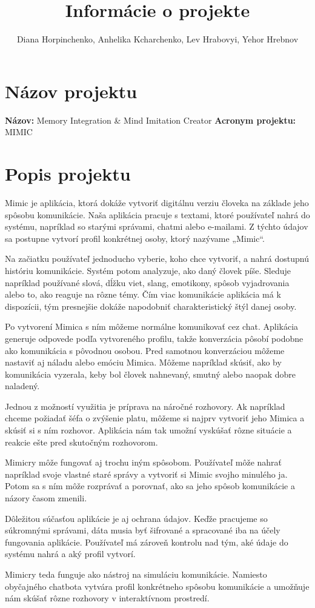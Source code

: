 \documentclass[12pt,a4paper]{article}
\title{Informácie o projekte}
\author{Diana Horpinchenko, Anhelika Kcharchenko, Lev Hrabovyi, Yehor Hrebnov}
\begin{document}
 
\maketitle \section*{Názov projektu} 
\textbf{Názov:} Memory Integration \& Mind Imitation Creator
 \vspace{0.5cm}
 \textbf{Acronym projektu:} MIMIC 
\vspace{0.5cm} 
\section*{Popis projektu} 
Mimic je aplikácia, ktorá dokáže vytvoriť digitálnu verziu človeka na základe jeho spôsobu komunikácie. Naša aplikácia pracuje s textami, ktoré používateľ nahrá do systému, napríklad so starými správami, chatmi alebo e-mailami. Z týchto údajov sa postupne vytvorí profil konkrétnej osoby, ktorý nazývame „Mimic“.

Na začiatku používateľ jednoducho vyberie, koho chce vytvoriť, a nahrá dostupnú históriu komunikácie. Systém potom analyzuje, ako daný človek píše. Sleduje napríklad používané slová, dĺžku viet, slang, emotikony, spôsob vyjadrovania alebo to, ako reaguje na rôzne témy. Čím viac komunikácie aplikácia má k dispozícii, tým presnejšie dokáže napodobniť charakteristický štýl danej osoby.

Po vytvorení Mimica s ním môžeme normálne komunikovať cez chat. Aplikácia generuje odpovede podľa vytvoreného profilu, takže konverzácia pôsobí podobne ako komunikácia s pôvodnou osobou. Pred samotnou konverzáciou môžeme nastaviť aj náladu alebo emóciu Mimica. Môžeme napríklad skúsiť, ako by komunikácia vyzerala, keby bol človek nahnevaný, smutný alebo naopak dobre naladený.

Jednou z možností využitia je príprava na náročné rozhovory. Ak napríklad chceme požiadať šéfa o zvýšenie platu, môžeme si najprv vytvoriť jeho Mimica a skúsiť si s ním rozhovor. Aplikácia nám tak umožní vyskúšať rôzne situácie a reakcie ešte pred skutočným rozhovorom.

Mimicry môže fungovať aj trochu iným spôsobom. Používateľ môže nahrať napríklad svoje vlastné staré správy a vytvoriť si Mimic svojho minulého ja. Potom sa s ním môže rozprávať a porovnať, ako sa jeho spôsob komunikácie a názory časom zmenili.

Dôležitou súčasťou aplikácie je aj ochrana údajov. Keďže pracujeme so súkromnými správami, dáta musia byť šifrované a spracované iba na účely fungovania aplikácie. Používateľ má zároveň kontrolu nad tým, aké údaje do systému nahrá a aký profil vytvorí.

Mimicry teda funguje ako nástroj na simuláciu komunikácie. Namiesto obyčajného chatbota vytvára profil konkrétneho spôsobu komunikácie a umožňuje nám skúšať rôzne rozhovory v interaktívnom prostredí.
\end{document}
